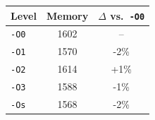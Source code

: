 \begin{tabular*}{\columnwidth}{@{\extracolsep\fill}lcc@{\extracolsep\fill}}
\toprule
\textbf{Level} & \textbf{Memory} & \textbf{$\Delta$ vs.\ \texttt{-O0}} \\
\midrule
\texttt{-O0} & 1602 & -- \\
\texttt{-O1} & 1570 & -2\% \\
\texttt{-O2} & 1614 & +1\% \\
\texttt{-O3} & 1588 & -1\% \\
\texttt{-Os} & 1568 & -2\% \\
\bottomrule
\end{tabular*}
